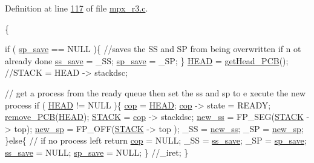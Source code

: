 Definition at line \hyperlink{mpx__r3_8c_source_l00117}{117} of file \hyperlink{mpx__r3_8c_source}{mpx\_\-r3.c}.




\begin{DoxyCode}
                             \{
        
        \textcolor{keywordflow}{if} ( \hyperlink{mpx__r3_8c_a8687fceb4a02634b3967391b0b584c4c}{sp_save} == NULL )\{ \textcolor{comment}{//saves the SS and SP from being overwritten if n
      ot already done}
                \hyperlink{mpx__r3_8c_aab74ba3fd0cd88eb3e908a0916cf39ca}{ss_save} = \_SS;
                \hyperlink{mpx__r3_8c_a8687fceb4a02634b3967391b0b584c4c}{sp_save} = \_SP;
                \}
                \hyperlink{mpx__r3_8c_a47c9132f8122c8d3c1e281fb0b55f245}{HEAD} = \hyperlink{mpx__r3_8c_aa7b04f866ead346c0357975285de0c38}{getHead_PCB}();
                \textcolor{comment}{//STACK = HEAD -> stackdsc;}
                
                \textcolor{comment}{// get a process from the ready queue then set the ss and sp to e
      xecute the new process}
                \textcolor{keywordflow}{if} ( \hyperlink{mpx__r3_8c_a47c9132f8122c8d3c1e281fb0b55f245}{HEAD} != NULL )\{
                        \hyperlink{mpx__r3_8c_a199c6145b9b5ee43b3961894ee22830a}{cop} = \hyperlink{mpx__r3_8c_a47c9132f8122c8d3c1e281fb0b55f245}{HEAD};
                        \hyperlink{mpx__r3_8c_a199c6145b9b5ee43b3961894ee22830a}{cop} -> state = READY;
                        \hyperlink{mpx__r2_8c_af30a3658210d449b4b53e5be2ed2bc2e}{remove_PCB}(\hyperlink{mpx__r3_8c_a47c9132f8122c8d3c1e281fb0b55f245}{HEAD});
                        \hyperlink{mpx__r3_8c_a5a528d0c0f300410569d8b820fd7a803}{STACK} = \hyperlink{mpx__r3_8c_a199c6145b9b5ee43b3961894ee22830a}{cop} -> stackdsc;
                        \hyperlink{mpx__r3_8c_a15a3c2a819d08f7ea4c3f453ca0f7f9c}{new_ss} = FP\_SEG(\hyperlink{mpx__r3_8c_a5a528d0c0f300410569d8b820fd7a803}{STACK} -> top);
                        \hyperlink{mpx__r3_8c_a1838f728cba427f51c6c45aa89cec007}{new_sp} = FP\_OFF(\hyperlink{mpx__r3_8c_a5a528d0c0f300410569d8b820fd7a803}{STACK} -> top );
                        \_SS = \hyperlink{mpx__r3_8c_a15a3c2a819d08f7ea4c3f453ca0f7f9c}{new_ss};
                        \_SP = \hyperlink{mpx__r3_8c_a1838f728cba427f51c6c45aa89cec007}{new_sp};
                \}\textcolor{keywordflow}{else}\{ \textcolor{comment}{// if no process left return}
                        \hyperlink{mpx__r3_8c_a199c6145b9b5ee43b3961894ee22830a}{cop} = NULL;
                        \_SS = \hyperlink{mpx__r3_8c_aab74ba3fd0cd88eb3e908a0916cf39ca}{ss_save};
                        \_SP = \hyperlink{mpx__r3_8c_a8687fceb4a02634b3967391b0b584c4c}{sp_save};
                        \hyperlink{mpx__r3_8c_aab74ba3fd0cd88eb3e908a0916cf39ca}{ss_save} = NULL;
                        \hyperlink{mpx__r3_8c_a8687fceb4a02634b3967391b0b584c4c}{sp_save} = NULL;
                \}
                \textcolor{comment}{//\_iret;        }
\}
\end{DoxyCode}


